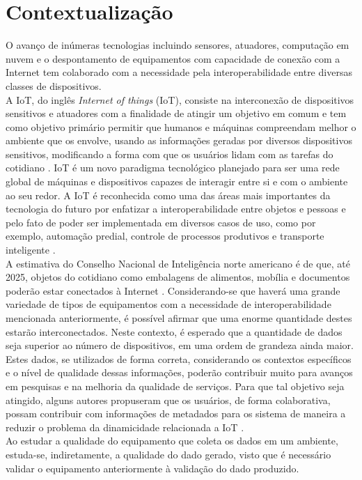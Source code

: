 \section{Contextualização}
\qquad
O avanço de inúmeras tecnologias incluindo sensores, atuadores, computação em nuvem e o despontamento de equipamentos com capacidade de conexão com a Internet tem colaborado com a necessidade pela interoperabilidade entre diversas classes de dispositivos.
\\ \null
\qquad
A \acrlong{IoT}, do inglês \textit{Internet of things} (\acrshort{IoT}), consiste na interconexão de dispositivos sensitivos e atuadores com a finalidade de atingir um objetivo em comum \cite{giusto} e tem como objetivo primário %
permitir que humanos e máquinas compreendam melhor o ambiente que os envolve, usando as informações geradas por
diversos dispositivos sensitivos, modificando a forma com que os usuários lidam com as tarefas do cotidiano \cite{IOTS}. \acrshort{IoT} é um novo paradigma tecnológico planejado para ser uma rede
global de máquinas e dispositivos capazes de interagir entre si e com o ambiente ao seu redor.
A \acrshort{IoT} é reconhecida como uma das áreas mais importantes da tecnologia do futuro por enfatizar a interoperabilidade entre objetos e pessoas e pelo fato de
poder ser implementada em diversos casos de uso, como por exemplo, automação predial, controle de processos produtivos e transporte inteligente \cite{IOTV}.
\\ \null
\qquad A estimativa do Conselho Nacional de Inteligência norte americano é de que, até 2025, objetos do cotidiano como embalagens de alimentos, mobília e documentos
poderão estar conectados à Internet \cite{intelsix}. Considerando-se que haverá uma grande variedade de tipos de equipamentos com a necessidade de interoperabilidade mencionada anteriormente,
é possível afirmar que uma enorme quantidade destes estarão interconectados. Neste contexto,
é esperado que a quantidade de dados seja superior ao número de dispositivos, em uma ordem de grandeza ainda maior.
\\ \null
\qquad Estes dados, se utilizados de forma correta, considerando os contextos específicos e o nível de qualidade dessas informações, poderão contribuir muito para avanços em pesquisas e na melhoria da qualidade de serviços. Para que tal objetivo seja atingido, alguns autores propuseram que os usuários, de forma colaborativa, possam contribuir com informações de metadados para os sistema de maneira a reduzir o problema da dinamicidade relacionada a \acrshort{IoT} \cite{collaborative}.
\\ \null \qquad Ao estudar a qualidade do equipamento que coleta os dados em um ambiente, estuda-se, indiretamente, a qualidade do dado gerado, visto que é necessário validar o equipamento anteriormente à validação do dado produzido.

